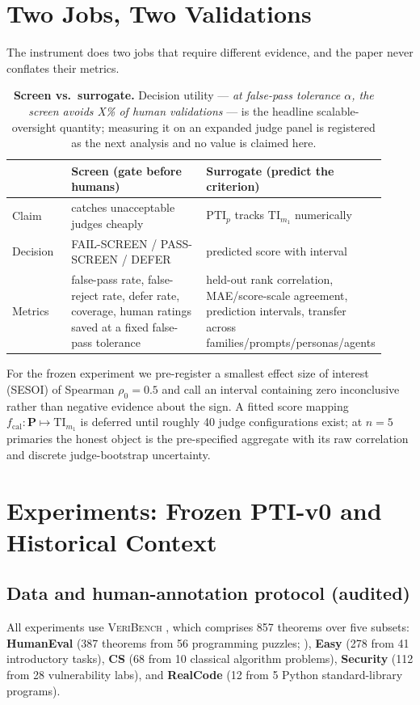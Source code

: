 \documentclass{article}
\newcommand{\TI}{\mathrm{TI}}                    %
\newcommand{\PTI}{\mathrm{PTI}}                  %
\newcommand{\TIm}[1]{\TI_{m_{#1}}}
\begin{document}
\section{Two Jobs, Two Validations}\label{sec:twojobs}

The instrument does two jobs that require different evidence, and the paper never conflates their metrics.

\begin{table}[h]
  \centering
  \small
  \begin{tabular}{@{}p{0.16\linewidth}p{0.38\linewidth}p{0.38\linewidth}@{}}
    \toprule
    & \textbf{Screen (gate before humans)} & \textbf{Surrogate (predict the criterion)} \\
    \midrule
    Claim & catches unacceptable judges cheaply & $\PTI_p$ tracks $\TIm{1}$ numerically \\
    Decision & FAIL-SCREEN / PASS-SCREEN / DEFER & predicted score with interval \\
    Metrics & false-pass rate, false-reject rate, defer rate, coverage, human ratings saved at a fixed false-pass tolerance & held-out rank correlation, MAE/score-scale agreement, prediction intervals, transfer across families/prompts/personas/agents \\
    \bottomrule
  \end{tabular}
  \caption{\textbf{Screen vs.\ surrogate.} Decision utility --- \emph{at false-pass tolerance $\alpha$, the screen avoids X\% of human validations} --- is the headline scalable-oversight quantity; measuring it on an expanded judge panel is registered as the next analysis and no value is claimed here.}
  \label{tab:twojobs}
\end{table}

For the frozen experiment we pre-register a smallest effect size of interest (SESOI) of Spearman $\rho_0=0.5$ and call an interval containing zero inconclusive rather than negative evidence about the sign.
A fitted score mapping $f_{\mathrm{cal}}: \mathbf{P} \mapsto \TIm{1}$ is deferred until roughly 40 judge configurations exist; at $n=5$ primaries the honest object is the pre-specified aggregate with its raw correlation and discrete judge-bootstrap uncertainty.

\section{Experiments: Frozen PTI-v0 and Historical Context}\label{sec:experiments}

\subsection{Data and human-annotation protocol (audited)}\label{sec:data}
All experiments use \textsc{VeriBench} \citep{miranda2026veribench}, which comprises 857 theorems over five subsets: \textbf{HumanEval} (387 theorems from 56 programming puzzles; \citealp{chen2021evaluating}), \textbf{Easy} (278 from 41 introductory tasks), \textbf{CS} (68 from 10 classical algorithm problems), \textbf{Security} (112 from 28 vulnerability labs), and \textbf{RealCode} (12 from 5 Python standard-library programs).
\end{document}
